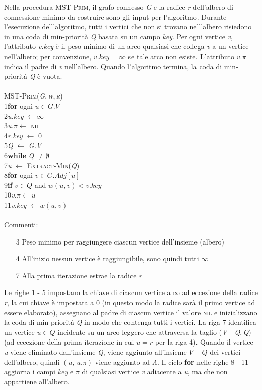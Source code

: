 \documentclass[10pt, a4paper]{report}
\newcommand\firsttab[1][0.5cm]{\hspace*{#1}}
\newcommand\secondtab[1][1cm]{\hspace*{#1}}
\newcommand\thirdtab[1][1.5cm]{\hspace*{#1}}
\newcommand\fourthtab[1][2cm]{\hspace*{#1}}
\begin{document}
Nella procedura \textsc{MST-Prim}, il grafo connesso \textit{G} e la radice \textit{r} dell'albero di connessione minimo da costruire sono gli input per l'algoritmo. Durante l'esecuzione dell'algoritmo, tutti i vertici che non si trovano nell'albero risiedono in una coda di min-priorità \textit{Q} basata su un campo \textit{key}. Per ogni vertice \textit{v}, l'attributo \textit{v.key} è il peso minimo di un arco qualsiasi che collega \textit{v} a un vertice nell'albero; per convenzione, $v.key = \infty$ se tale arco non esiste. L'attributo $v.\pi$ indica il padre di \textit{v} nell'albero. Quando l'algoritmo termina, la coda di min-priorità \textit{Q} è vuota.\\\\
\textsc{MST-Prim(\textit{G},\,\textit{w},\,\textit{r})}\\
1\firsttab\textbf{for} ogni $u \in G.V$\\
2\secondtab\textit{u.key} $\leftarrow \infty$\\
3\secondtab\textit{u.}$\pi \leftarrow$ \textsc{nil}\\
4\firsttab\textit{r.key} $\leftarrow$ 0\\
5\firsttab\textit{Q} $\leftarrow$ \textit{G.V}\\
6\firsttab\textbf{while} \textit{Q} $\neq \emptyset$\\
7\secondtab\textit{u} $\leftarrow$ \textsc{Extract-Min(\textit{Q})}\\
8\secondtab\textbf{for} ogni $v \in G.Adj[u]$\\
9\thirdtab\textbf{if} $v \in Q$ and $w(u,v) < v.key$\\
10\fourthtab\textit{v.}$\pi \leftarrow u$\\
11\fourthtab\textit{v.key} $\leftarrow w(u,v)$\\\\
Commenti:
\begin{enumerate}
\item[3]Peso minimo per raggiungere ciascun vertice dell'insieme (albero)
\item[4]All'inizio nessun vertice è raggiungibile, sono quindi tutti $\infty$
\item[7]Alla prima iterazione estrae la radice \textit{r}
\end{enumerate}
Le righe 1 - 5 impostano la chiave di ciascun vertice a $\infty$ ad eccezione della radice \textit{r}, la cui chiave è impostata a 0 (in questo modo la radice sarà il primo vertice ad essere elaborato), assegnano al padre di ciascun vertice il valore \textsc{nil} e inizializzano la coda di min-priorità \textit{Q} in modo che contenga tutti i vertici. La riga 7 identifica un vertice $u \in Q$ incidente su un arco leggero che attraversa la taglio (\textit{V - Q},\,\textit{Q}) (ad eccezione della prima iterazione in cui $u = r$ per la riga 4). Quando il vertice \textit{u} viene eliminato dall'insieme \textit{Q}, viene aggiunto all'insieme $V - Q$ dei vertici dell'albero, quindi $(u,\,u.\pi)$ viene aggiunto ad \textit{A}. Il ciclo \textbf{for} nelle righe 8 - 11 aggiorna i campi \textit{key} e $\pi$ di qualsiasi vertice \textit{v} adiacente a \textit{u}, ma che non appartiene all'albero.
\end{document}
